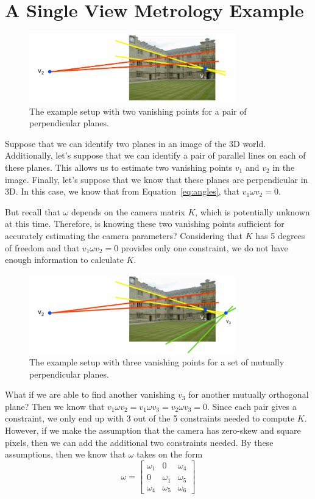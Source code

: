\documentclass[a4paper, 12pt]{article}
\begin{document}
\section{A Single View Metrology Example}
\begin{figure}[h!]
\centering
\includegraphics[width=0.8\textwidth]{figures/example1.png}
\caption{The example setup with two vanishing points for a pair of perpendicular planes.}
\label{fig:example1}
\end{figure}
Suppose that we can identify two planes in an image of the 3D world. Additionally, let's suppose that we can identify a pair of parallel lines on each of these planes. This allows us to estimate two vanishing points $v_1$ and $v_2$ in the image. Finally, let's suppose that we know that these planes are perpendicular in 3D. In this case, we know that from Equation~\ref{eq:angles}, that $v_1\omega v_2 = 0$. 

But recall that $\omega$ depends on the camera matrix $K$, which is potentially unknown at this time. Therefore, is knowing these two vanishing points sufficient for accurately estimating the camera parameters? Considering that $K$ has 5 degrees of freedom and that $v_1 \omega v_2 = 0$ provides only one constraint, we do not have enough information to calculate $K$. 
\begin{figure}[h!]
\centering
\includegraphics[width=0.8\textwidth]{figures/example2.png}
\caption{The example setup with three vanishing points for a set of mutually perpendicular planes.}
\label{fig:example2}
\end{figure}
What if we are able to find another vanishing $v_3$ for another mutually orthogonal plane? Then we know that $v_1\omega v_2 = v_1\omega v_3 = v_2\omega v_3 = 0$. Since each pair gives a constraint, we only end up with 3 out of the 5 constraints needed to compute $K$. However, if we make the assumption that the camera has zero-skew and square pixels, then we can add the additional two constraints needed. By these assumptions, then we know that $\omega$ takes on the form 
\begin{equation}
    \omega = \begin{bmatrix}\omega_1 & 0 & \omega_4 \\ 0 & \omega_1 & \omega_5 \\ \omega_4 & \omega_5 &\omega_6 \end{bmatrix}
\end{equation}
\end{document}
